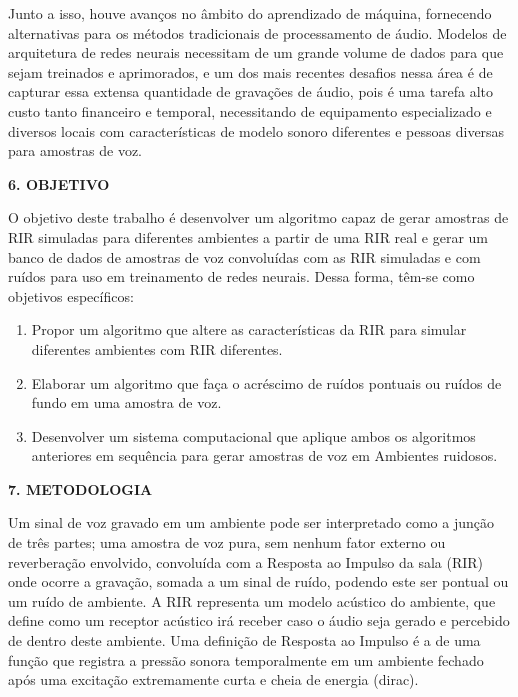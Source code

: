 \documentclass[a4paper,12pt,oneside,openany]{report}
\begin{document}

Junto a isso, houve avanços no âmbito do aprendizado de máquina, fornecendo alternativas para os métodos tradicionais de processamento de áudio.
Modelos de arquitetura de redes neurais necessitam de um grande volume de dados para que sejam treinados e aprimorados, e um dos mais recentes
desafios nessa área é de capturar essa extensa quantidade de gravações de áudio, pois é uma tarefa alto custo tanto financeiro e temporal, necessitando
de equipamento especializado e diversos locais com características de modelo sonoro diferentes e pessoas diversas para amostras de voz.

\vspace{0.4cm}
\textbf{6. OBJETIVO}

O objetivo deste trabalho é desenvolver um algoritmo capaz de gerar amostras de RIR simuladas para diferentes ambientes a partir de uma RIR real e
gerar um banco de dados de amostras de voz convoluídas com as RIR simuladas e com ruídos para uso em treinamento de redes neurais.
Dessa forma, têm-se como objetivos específicos:

\begin{enumerate}
      \item Propor um algoritmo que altere as características da RIR para simular diferentes ambientes com RIR diferentes.
      \item Elaborar um algoritmo que faça o acréscimo de ruídos pontuais ou ruídos de fundo em uma amostra de voz.
      \item Desenvolver um sistema computacional que aplique ambos os algoritmos anteriores em sequência para gerar
      amostras de voz em Ambientes ruidosos.
\end{enumerate}

\vspace{0.4cm}
\textbf{7. METODOLOGIA}

Um sinal de voz gravado em um ambiente pode ser interpretado como a junção de três partes; uma amostra de voz pura, sem nenhum fator externo
ou reverberação envolvido, convoluída com a Resposta ao Impulso da sala (RIR) onde ocorre a gravação, somada a um sinal de ruído, podendo este 
ser pontual ou um ruído de ambiente. A RIR representa um modelo acústico do ambiente, que define como um receptor acústico irá receber caso o áudio
seja gerado e percebido de dentro deste ambiente. Uma definição de Resposta ao Impulso é a de uma função que registra a pressão sonora temporalmente
em um ambiente fechado após uma excitação extremamente curta e cheia de energia (dirac).
\end{document}

